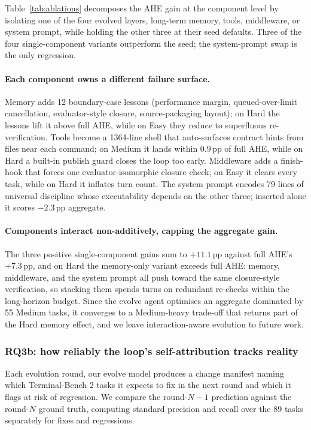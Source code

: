 Table~\ref{tab:ablations} decomposes the AHE gain at the component level by isolating one of the four evolved layers, long-term memory, tools, middleware, or system prompt, while holding the other three at their seed defaults. Three of the four single-component variants outperform the seed; the system-prompt swap is the only regression.



\paragraph{Each component owns a different failure surface.}
Memory adds 12 boundary-case lessons (performance margin, queued-over-limit cancellation, evaluator-style closure, source-packaging layout); on Hard the lessons lift it above full AHE, while on Easy they reduce to superfluous re-verification.
Tools become a 1364-line shell that auto-surfaces contract hints from files near each command; on Medium it lands within $0.9$\,pp of full AHE, while on Hard a built-in publish guard closes the loop too early.
Middleware adds a finish-hook that forces one evaluator-isomorphic closure check; on Easy it clears every task, while on Hard it inflates turn count.
The system prompt encodes 79 lines of universal discipline whose executability depends on the other three; inserted alone it scores $-2.3$\,pp aggregate.

\paragraph{Components interact non-additively, capping the aggregate gain.}
The three positive single-component gains sum to $+11.1$\,pp against full AHE's $+7.3$\,pp, and on Hard the memory-only variant exceeds full AHE: memory, middleware, and the system prompt all push toward the same closure-style verification, so stacking them spends turns on redundant re-checks within the long-horizon budget.
Since the evolve agent optimises an aggregate dominated by 55 Medium tasks, it converges to a Medium-heavy trade-off that returns part of the Hard memory effect, and we leave interaction-aware evolution to future work.

\subsubsection{RQ3b: how reliably the loop's self-attribution tracks reality}
\label{sec:experiments:rq3b}

Each evolution round, our evolve model produces a change manifest naming which Terminal-Bench 2 tasks it expects to fix in the next round and which it flags at risk of regression. We compare the round-$N{-}1$ prediction against the round-$N$ ground truth, computing standard precision and recall over the 89 tasks separately for fixes and regressions.

